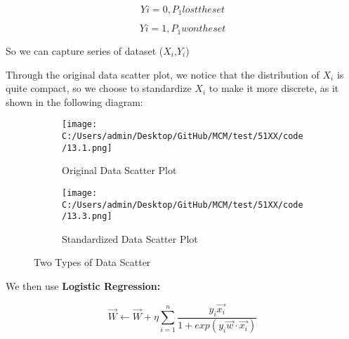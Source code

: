 \documentclass{mcmthesis}
\begin{document}
\begin{equation} \label{eq4}
    Y{i} = 0, P_1  lost the set
\end{equation}

\begin{equation} \label{eq5}
    Y{i} = 1, P_1   won the set
\end{equation}

    So we can capture series of dataset ($X_i$,$Y_i$)

    Through the original data scatter plot, we notice that the distribution of $X_i$ is quite compact, so we choose to standardize $X_i$ to make it more discrete, as it shown in the following diagram:

\begin{figure}[h]
    \centering
    \begin{subfigure}{0.45\textwidth}  
        \texttt{[image: C:/Users/admin/Desktop/GitHub/MCM/test/51XX/code/13.1.png]}
        \caption{Original Data Scatter Plot}  
        \label{fig:first}
    \end{subfigure}
    \hfill
    \begin{subfigure}{0.45\textwidth}
        \texttt{[image: C:/Users/admin/Desktop/GitHub/MCM/test/51XX/code/13.3.png]}
        \caption{Standardized Data Scatter Plot} 
        \label{fig:second}
    \end{subfigure}
        
    \caption{Two Types of Data Scatter} 
    \label{fig:twoimages}
\end{figure}

    We then use {\bf Logistic Regression:}

\begin{equation} \label{eq6}
\vec{W}\leftarrow \vec{W}+\eta\sum_{i=1}^{n}\frac{y_i\vec{x_i}}{1+exp(y_i\vec{w}\cdot\vec{x_i})}
\end{equation}
\end{document}
